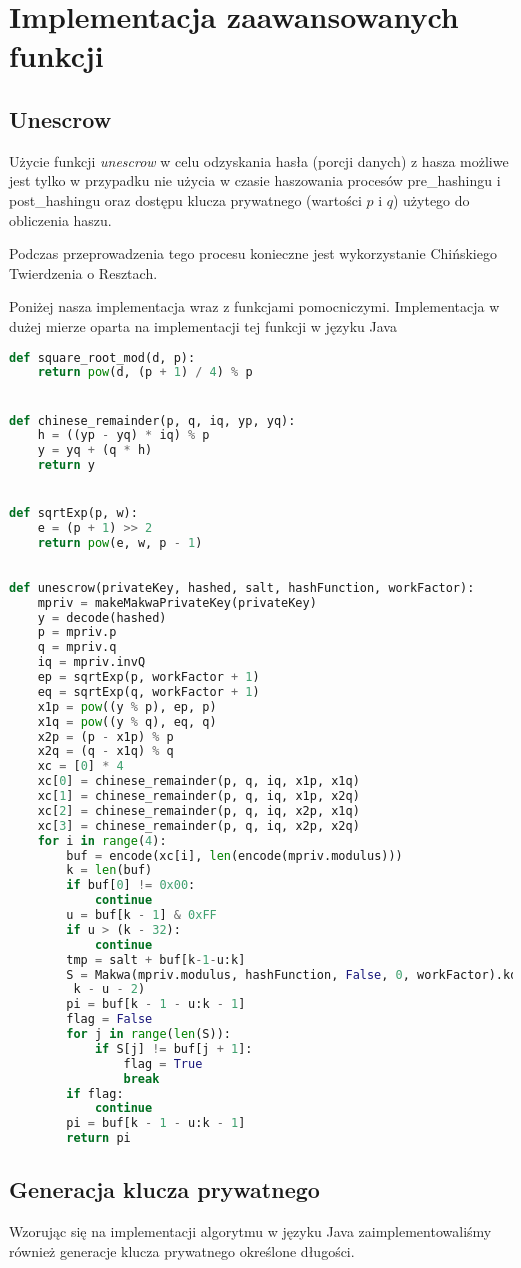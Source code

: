 \documentclass[a4paper,titleauthor]{mwart}
\begin{document}
\section{Implementacja zaawansowanych funkcji}
\subsection{Unescrow}
Użycie funkcji \textit{unescrow} w celu odzyskania hasła (porcji danych) z hasza możliwe jest tylko w przypadku nie użycia w czasie haszowania procesów pre\_hashingu i post\_hashingu oraz dostępu klucza prywatnego (wartości $p$ i $q$) użytego do obliczenia haszu.

Podczas przeprowadzenia tego procesu konieczne jest wykorzystanie Chińskiego Twierdzenia o Resztach.

Poniżej nasza implementacja wraz z funkcjami pomocniczymi. Implementacja w dużej mierze oparta na implementacji tej funkcji w języku Java
\begin{lstlisting}[language=Python]
def square_root_mod(d, p):
	return pow(d, (p + 1) / 4) % p


def chinese_remainder(p, q, iq, yp, yq):
	h = ((yp - yq) * iq) % p
	y = yq + (q * h)
	return y


def sqrtExp(p, w):
	e = (p + 1) >> 2
	return pow(e, w, p - 1)
	
	
def unescrow(privateKey, hashed, salt, hashFunction, workFactor):
	mpriv = makeMakwaPrivateKey(privateKey)
	y = decode(hashed)
	p = mpriv.p
	q = mpriv.q
	iq = mpriv.invQ
	ep = sqrtExp(p, workFactor + 1)
	eq = sqrtExp(q, workFactor + 1)
	x1p = pow((y % p), ep, p)
	x1q = pow((y % q), eq, q)
	x2p = (p - x1p) % p
	x2q = (q - x1q) % q
	xc = [0] * 4
	xc[0] = chinese_remainder(p, q, iq, x1p, x1q)
	xc[1] = chinese_remainder(p, q, iq, x1p, x2q)
	xc[2] = chinese_remainder(p, q, iq, x2p, x1q)
	xc[3] = chinese_remainder(p, q, iq, x2p, x2q)
	for i in range(4):
		buf = encode(xc[i], len(encode(mpriv.modulus)))
		k = len(buf)
		if buf[0] != 0x00:
			continue
		u = buf[k - 1] & 0xFF
		if u > (k - 32):
			continue
		tmp = salt + buf[k-1-u:k]
		S = Makwa(mpriv.modulus, hashFunction, False, 0, workFactor).kdf(tmp, /
		 k - u - 2)
		pi = buf[k - 1 - u:k - 1]
		flag = False
		for j in range(len(S)):
			if S[j] != buf[j + 1]:
				flag = True
				break
		if flag:
			continue
		pi = buf[k - 1 - u:k - 1]
		return pi
\end{lstlisting}
\subsection{Generacja klucza prywatnego}
Wzorując się na implementacji algorytmu w języku Java  zaimplementowaliśmy również generacje klucza prywatnego określone długości.
\end{document}
